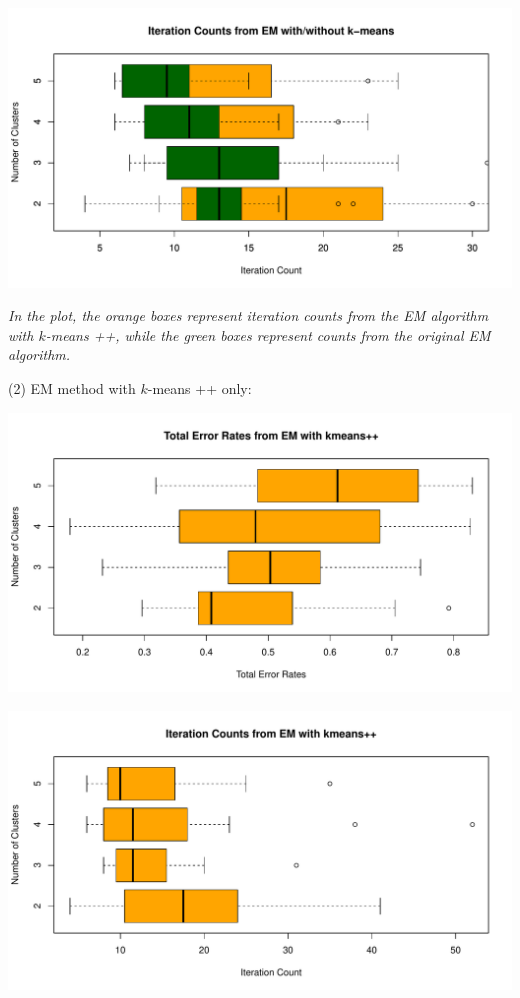 \documentclass[a4paper,12pt]{article}
\newcommand{\km}{$k$-means }
\begin{document}
\begin{center}
  \includegraphics[width=0.9\linewidth]{Image/ProbEC1-ItrCount-Ionosphere-Both.pdf}
  
   \parbox{0.9\textwidth}{\textit{In the plot, the \textcolor{myorange}{orange boxes} represent iteration counts from the EM algorithm with \km++, while the \textcolor{mydarkgreen}{green boxes} represent counts from the original EM algorithm. 
  }}
\end{center}
\bigskip

\noindent (2) EM method with \km++ only:
\begin{center}
  \includegraphics[width=0.8\linewidth]{Image/ProbEC1-TotalErr-Ionosphere-EMkpp.pdf}
\end{center}
\begin{center}
  \includegraphics[width=0.8\linewidth]{Image/ProbEC1-ItrCount-Ionosphere-EMkpp.pdf}
\end{center}
\bigskip
\end{document}
